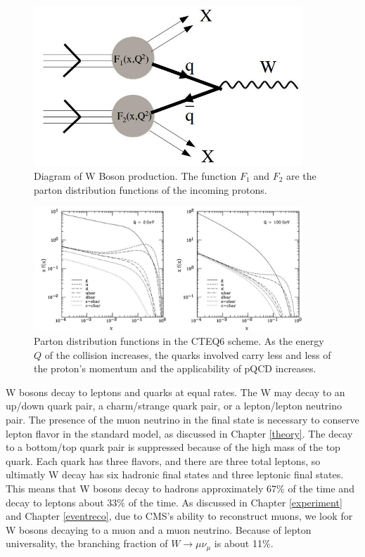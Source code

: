 \documentclass[oneside, letterpaper, oldfontcommands]{memoir}
\begin{document}
\begin{figure}[here]
\includegraphics[width=0.9\textwidth]{WFormation.jpg}
\caption{Diagram of W Boson production. The function $F_{1}$ and $F_{2}$ are the parton distribution functions of the incoming protons.}
\label{fig:WFormation}
\end{figure}

\begin{figure}[here]
\includegraphics[width=0.9\textwidth]{cteq6PDF.jpg}
\caption{Parton distribution functions in the CTEQ6 scheme\cite{Pumplin:2002vw}. As the energy $Q$ of the collision increases, the quarks involved carry less and less of the proton's momentum and the applicability of pQCD increases.}
\label{fig:cteq6PDF}
\end{figure}

\qquad W bosons decay to leptons and quarks at equal rates. The W may decay to an up/down quark pair, a charm/strange quark pair, or a lepton/lepton neutrino pair. The presence of the muon neutrino in the final state is necessary to conserve lepton flavor in the standard model, as discussed in Chapter \ref{theory}.  The decay to a bottom/top quark pair is suppressed because of the high mass of the top quark. Each quark has three flavors, and there are three total leptons, so ultimatly W decay has six hadronic final states and three leptonic final states. This means that W bosons decay to hadrons approximately 67$\%$ of the time and decay to leptons about $33\%$ of the time. As discussed in Chapter \ref{experiment} and Chapter \ref{eventreco}, due to CMS's ability to reconstruct muons, we look for W bosons decaying to a muon and a muon neutrino. Because of lepton universality, the branching fraction of $W \rightarrow \mu\nu_{\mu}$ is about 11$\%$. 
\end{document}
